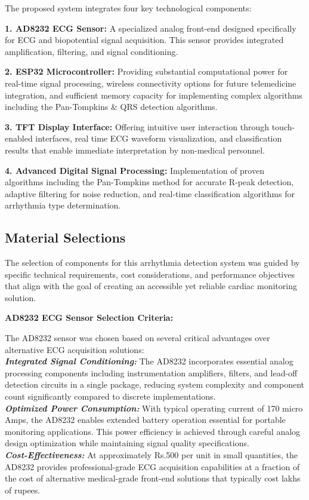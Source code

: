 \documentclass[12pt,a4paper]{article}
\begin{document}
\begin{multicols}{2}
The proposed system integrates four key technological components:

\vspace{0.3cm}

\textbf{1. AD8232 ECG Sensor:} A specialized analog front-end designed specifically for ECG and biopotential signal acquisition. This sensor provides integrated amplification, filtering, and signal conditioning.

\textbf{2. ESP32 Microcontroller:} Providing substantial computational power for real-time signal processing, wireless connectivity options for future telemedicine integration, and sufficient memory capacity for implementing complex algorithms including the Pan-Tompkins \& QRS detection algorithms.

\textbf{3. TFT Display Interface:} Offering intuitive user interaction through touch-enabled interfaces, real time ECG waveform visualization, and classification results that enable immediate interpretation by non-medical personnel.

\textbf{4. Advanced Digital Signal Processing:} Implementation of proven algorithms including the Pan-Tompkins method for accurate R-peak detection, adaptive filtering for noise reduction, and real-time classification algorithms for arrhythmia type determination.

\subsection{Material Selections}

The selection of components for this arrhythmia detection system was guided by specific technical requirements, cost considerations, and performance objectives that align with the goal of creating an accessible yet reliable cardiac monitoring solution.

\vspace{0.3cm}

\textbf{AD8232 ECG Sensor Selection Criteria:}

The AD8232 sensor was chosen based on several critical advantages over alternative ECG acquisition solutions: \\

\textit{\textbf{Integrated Signal Conditioning:}} The AD8232 incorporates essential analog processing components including instrumentation amplifiers, filters, and lead-off detection circuits in a single package, reducing system complexity and component count significantly compared to discrete implementations. \\
\textit{\textbf{Optimized Power Consumption:}} With typical operating current of 170 micro Amps, the AD8232 enables extended battery operation essential for portable monitoring applications. This power efficiency is achieved through careful analog design optimization while maintaining signal quality specifications. \\
\textit{\textbf{Cost-Effectiveness:}} At approximately Rs.500 per unit in small quantities, the AD8232 provides professional-grade ECG acquisition capabilities at a fraction of the cost of alternative medical-grade front-end solutions that typically cost lakhs of rupees.


\end{multicols}
\end{document}
